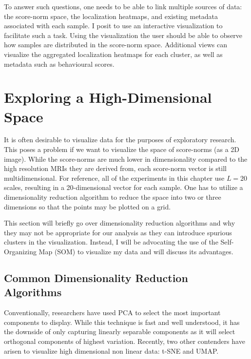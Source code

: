 To answer such questions, one needs to be able to link multiple sources of data: the score-norm space, the localization heatmaps, and existing metadata associated with each sample. I posit to use an interactive visualization to facilitate such a task.
Using the visualization the user should be able to observe how samples are distributed in the score-norm space. Additional views can visualize the aggregated localization heatmaps for each cluster, as well as metadata such as behavioural scores.


\section{Exploring a High-Dimensional Space}

It is often desirable to visualize data for the purposes of exploratory research. This poses a problem if we want to visualize the space of score-norms (as a 2D image). While the score-norms are much lower in dimensionality compared to the high resolution MRIs they are derived from, each score-norm vector is still multidimensional. For reference, all of the experiments in this chapter use $L=20$ scales, resulting in a 20-dimensional vector for each sample. One has to utilize a dimensionality reduction algorithm to reduce the space into two or three dimensions so that the points may be plotted on a grid.

This section will briefly go over dimensionality reduction algorithms and why they may not be appropriate for our analysis as they can introduce spurious clusters in the visualization. Instead, I will be advocating the use of the Self-Organizing Map (SOM) to visualize my data and will discuss its advantages.


\subsection*{Common Dimensionality Reduction Algorithms}

Conventionally, researchers have used PCA to select the most important components to display. While this technique is fast and well understood, it has the downside of only capturing linearly separable components as it will select orthogonal components of highest variation. Recently, two other contenders have arisen to visualize high dimensional non linear data: t-SNE and UMAP.  


